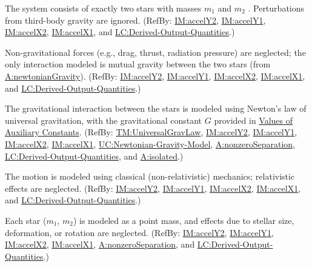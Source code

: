 \documentclass[12pt]{article}
\begin{document}
\begin{description}[font=\normalfont]
\item[twoBody:\phantomsection\label{twoBody}]{The system consists of exactly two stars with masses ${m_{1}}$ and ${m_{2}}$ . Perturbations from third-body gravity are ignored. (RefBy: \hyperref[IM:accelY2]{IM:accelY2}, \hyperref[IM:accelY1]{IM:accelY1}, \hyperref[IM:accelX2]{IM:accelX2}, \hyperref[IM:accelX1]{IM:accelX1}, and \hyperref[lcDerivedOutputs]{LC:Derived-Output-Quantities}.)}
\item[isolated:\phantomsection\label{isolated}]{Non-gravitational forces (e.g., drag, thrust, radiation pressure) are neglected; the only interaction modeled is mutual gravity between the two stars (from \hyperref[newtonianGravity]{A:newtonianGravity}). (RefBy: \hyperref[IM:accelY2]{IM:accelY2}, \hyperref[IM:accelY1]{IM:accelY1}, \hyperref[IM:accelX2]{IM:accelX2}, \hyperref[IM:accelX1]{IM:accelX1}, and \hyperref[lcDerivedOutputs]{LC:Derived-Output-Quantities}.)}
\item[newtonianGravity:\phantomsection\label{newtonianGravity}]{The gravitational interaction between the stars is modeled using Newton's law of universal gravitation, with the gravitational constant $G$ provided in \hyperref[Sec:AuxConstants]{Values of Auxiliary Constants}. (RefBy: \hyperref[TM:UniversalGravLaw]{TM:UniversalGravLaw}, \hyperref[IM:accelY2]{IM:accelY2}, \hyperref[IM:accelY1]{IM:accelY1}, \hyperref[IM:accelX2]{IM:accelX2}, \hyperref[IM:accelX1]{IM:accelX1}, \hyperref[ucNewtonianGravity]{UC:Newtonian-Gravity-Model}, \hyperref[nonzeroSeparation]{A:nonzeroSeparation}, \hyperref[lcDerivedOutputs]{LC:Derived-Output-Quantities}, and \hyperref[isolated]{A:isolated}.)}
\item[nonRelativistic:\phantomsection\label{nonRelativistic}]{The motion is modeled using classical (non-relativistic) mechanics; relativistic effects are neglected. (RefBy: \hyperref[IM:accelY2]{IM:accelY2}, \hyperref[IM:accelY1]{IM:accelY1}, \hyperref[IM:accelX2]{IM:accelX2}, \hyperref[IM:accelX1]{IM:accelX1}, and \hyperref[lcDerivedOutputs]{LC:Derived-Output-Quantities}.)}
\item[pointMass:\phantomsection\label{pointMass}]{Each star (${m_{1}}$, ${m_{2}}$) is modeled as a point mass, and effects due to stellar size, deformation, or rotation are neglected. (RefBy: \hyperref[IM:accelY2]{IM:accelY2}, \hyperref[IM:accelY1]{IM:accelY1}, \hyperref[IM:accelX2]{IM:accelX2}, \hyperref[IM:accelX1]{IM:accelX1}, \hyperref[nonzeroSeparation]{A:nonzeroSeparation}, and \hyperref[lcDerivedOutputs]{LC:Derived-Output-Quantities}.)}

\end{description}
\end{document}
